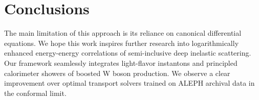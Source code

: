 \section{Conclusions}\label{sec:conclusions}

The main limitation of this approach is its reliance on canonical
differential equations. We hope this work inspires further research into
logarithmically enhanced energy-energy correlations of semi-inclusive
deep inelastic scattering. Our framework seamlessly integrates
light-flavor instantons and principled calorimeter showers of boosted W
boson production. We observe a clear improvement over optimal transport
solvers trained on ALEPH archival data in the conformal limit.

